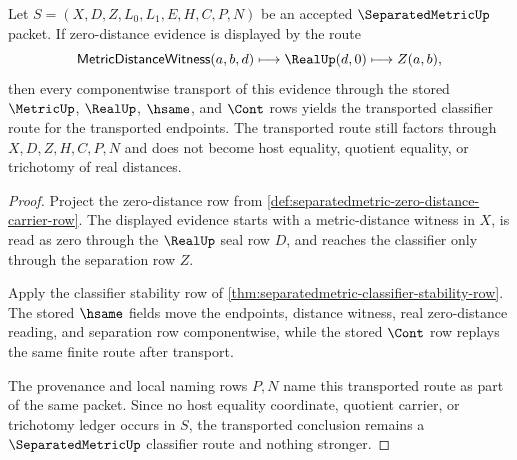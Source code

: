 \begin{theorem}\label{thm:separatedmetric-zero-distance-transport}
Let $S=(X,D,Z,L_0,L_1,E,H,C,P,N)$ be an accepted $\SeparatedMetricUp$ packet. If zero-distance evidence is displayed by the route
$$
\mathsf{MetricDistanceWitness}(a,b,d) \longmapsto \RealUp(d,0) \longmapsto Z(a,b),
$$
then every componentwise transport of this evidence through the stored $\MetricUp$, $\RealUp$, $\hsame$, and $\Cont$ rows yields the transported classifier route for the transported endpoints. The transported route still factors through $X,D,Z,H,C,P,N$ and does not become host equality, quotient equality, or trichotomy of real distances.
\end{theorem}
\begin{proof}
Project the zero-distance row from \autoref{def:separatedmetric-zero-distance-carrier-row}. The displayed evidence starts with a metric-distance witness in $X$, is read as zero through the $\RealUp$ seal row $D$, and reaches the classifier only through the separation row $Z$.

Apply the classifier stability row of \autoref{thm:separatedmetric-classifier-stability-row}. The stored $\hsame$ fields move the endpoints, distance witness, real zero-distance reading, and separation row componentwise, while the stored $\Cont$ row replays the same finite route after transport.

The provenance and local naming rows $P,N$ name this transported route as part of the same packet. Since no host equality coordinate, quotient carrier, or trichotomy ledger occurs in $S$, the transported conclusion remains a $\SeparatedMetricUp$ classifier route and nothing stronger.
\end{proof}


